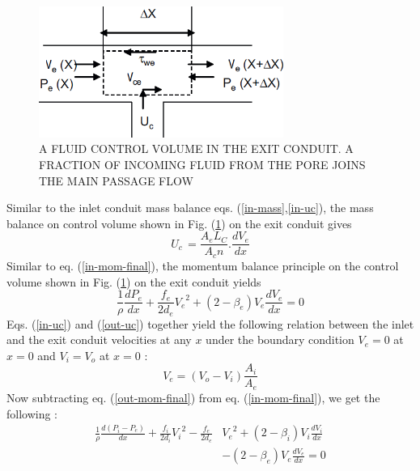 \documentclass[twocolumn,10pt,cleanfoot]{ihmtc}
\begin{document}
%
\begin{figure}[ht]
\centerline{\includegraphics[width=80mm,scale=0.50]{exitcon.PNG}}
\vspace{-1.5ex}
\caption{\small{A FLUID CONTROL VOLUME IN THE EXIT CONDUIT. A FRACTION OF INCOMING FLUID FROM THE PORE JOINS THE MAIN PASSAGE FLOW}}
\label{exitcon}
\end{figure}
%
Similar to the inlet conduit mass balance eqs. (\ref{in-mass},\ref{in-uc}), the mass balance on control volume shown in Fig. (\ref{exitcon}) on the exit conduit gives
%
\begin{equation} \label{out-uc}
{{U}_{c}}\,=\frac{{{A}_{e}}L_C}{{{A}_{c}}n}.\frac{d{{V}_{e}}}{dx}
\end{equation}
%
Similar to eq. (\ref{in-mom-final}), the momentum balance principle on the control volume shown in Fig. (\ref{exitcon}) on the exit conduit yields
%
\begin{equation} \label{out-mom-final}
\frac{1}{\rho }\frac{d{{P}_{e}}}{dx}+\frac{{{f}_{e}}}{2{{d}_{e}}}{{V}_{e}}^{2}+(2-{{\beta }_{e}}){{V}_{e}}\frac{d{{V}_{e}}}{dx}=0
\end{equation}
%
Eqs. (\ref{in-uc}) and (\ref{out-uc}) together yield the following
relation between the inlet and the exit conduit velocities at any
$x$ under the boundary condition $V_e=0$ at $x=0$ and $V_i=V_o$ at $x=0$ :
%
\begin{equation} \label{vel-relation}
{{V}_{e}}=\left( {{V}_{o}}-{{V}_{i}} \right)\frac{{{A}_{i}}}{{{A}_{e}}}
\end{equation}
%
Now subtracting eq. (\ref{out-mom-final}) from eq. (\ref{in-mom-final}),
we get the following : 
%
\begin{equation} \label{combined-mom}
\begin{split}
\frac{1}{\rho}\frac{d({{P}_{i}}-{{P}_{e}})}{dx}+\frac{{f}_{i}}{2{{d}_{i}}}{{V}_{i}}^{2}-\frac{{f}_{e}}{2{{d}_{e}}} & {{V}_{e}}^{2} +(2-{\beta}_{i}){V}_{i}\frac{d{{V}_{i}}}{dx}\\ 
& - (2-{\beta }_{e}){V}_{e}\frac{d{{V}_{e}}}{dx}=0
\end{split}
\end{equation}
\end{document}
